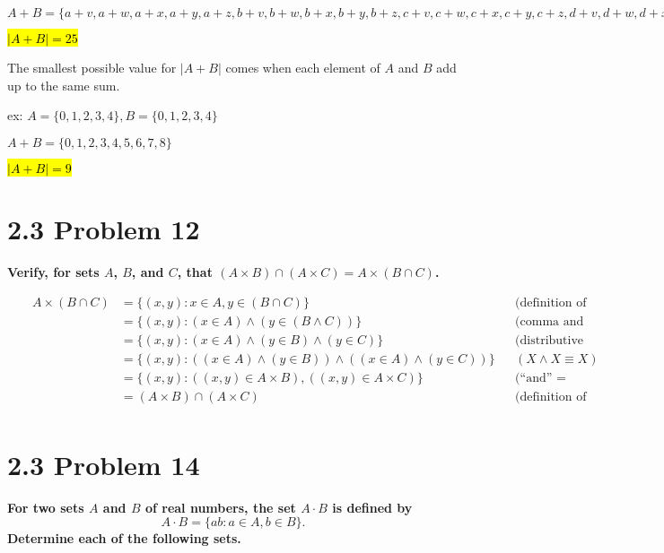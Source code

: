 \documentclass[10pt]{article}
\begin{document}
$A + B = \{a+v, a+w, a+x, a+y, a+z, b+v, b+w, b+x, b+y, b+z, c+v, c+w, c+x, c+y, c+z,
d+v, d+w, d+x, d+y, d+z, e+v, e+w, e+x, e+y, e+z\}$

\hl{$|A + B| = 25$}

\par \vspace{\baselineskip}

The smallest possible value for $|A + B|$ comes when each element of $A$ and $B$ add
up to the same sum.

\par \vspace{\baselineskip}

ex: $A = \{0,1,2,3,4\}, B = \{0,1,2,3,4\}$

$A + B = \{0,1,2,3,4,5,6,7,8\}$

\hl{$|A + B| = 9$}



\section{2.3 Problem 12}
\textbf{Verify, for sets $A$, $B$, and $C$, that $(A \times B) \cap (A \times C) = A \times (B \cap C)$.}

\begin{align*}
    && A \times (B \cap C) &= \{(x,y) : x \in A, y \in (B \cap C)\} && 
    \text{(definition of the product between sets)} \\
    && &= \{(x,y) : (x \in A) \wedge (y \in (B \wedge C))\} && \text{(comma and intercept = ``and'')} \\
    && &= \{(x,y) : (x \in A) \wedge (y \in B) \wedge (y \in C)\} && \text{(distributive property)} \\
    && &= \{(x,y) : ((x \in A) \wedge (y \in B)) \wedge ((x \in A) \wedge (y \in C))\} &&
    (X \wedge X \equiv X) \\
    && &= \{(x,y) : ((x,y) \in A \times B) , ((x,y) \in A \times C)\} && 
    \text{(``and'' = comma)} \\
    && &= (A \times B) \cap (A \times C) && \text{(definition of the product between sets)} \\
\end{align*}



\section{2.3 Problem 14}
\textbf{For two sets $A$ and $B$ of real numbers, the set $A \cdot B$ is defined by
$$A \cdot B = \{ab : a \in A, b \in B\}.$$ Determine each of the following sets.}
\end{document}
